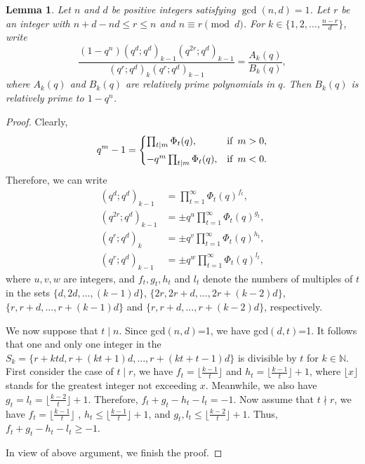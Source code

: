 \documentclass[12pt]{article}
\newtheorem{lem}[thm]{Lemma}
\def\N{{\mathbb N}}
\numberwithin{equation}{section}
\begin{document}
\begin{lem}\label{lem:G-div-n}
    Let $n$ and $d$ be positive integers satisfying $\gcd(n,d)=1$. Let $r$ be an integer with $n+d-nd\leqslant r \leqslant n$ and 
    $n\equiv r \pmod{d} $. For $k\in \{1,2,\dots,\frac{n-r}{d}\}$, write 
    \[\frac{(1-q^n)(q^d;q^d)_{k-1}(q^{2r};q^d)_{k-1}}{(q^r;q^d)_{k}(q^r;q^d)_{k-1}}=\frac{A_k(q)}{B_k(q)},\]
    where $A_k(q)$ and $B_k(q)$ are relatively prime polynomials in $q$. Then $B_k(q)$ is relatively prime to $1-q^n$.
\end{lem}
\begin{proof}
    Clearly,
    \begin{align*}
        q^m-1=
        \begin{cases}
            \prod_{t\mid m}^{}\Phi_t(q),     & \text{if}\hspace{0.5em} m>0,\\[4pt]
            -q^m\prod_{t\mid m}^{}\Phi_t(q), & \text{if}\hspace{0.5em} m<0.
        \end{cases}
    \end{align*}
    Therefore, we can write
    \begin{align*}
        (q^d;q^d)_{k-1}&=\prod_{t=1}^{\infty}\Phi_t(q)^{f_t},\\
        (q^{2r};q^d)_{k-1}&=\pm q^u\prod_{t=1}^{\infty}\Phi_t(q)^{g_t},\\
        (q^{r};q^d)_{k}&=\pm q^v\prod_{t=1}^{\infty}\Phi_t(q)^{h_t},\\
        (q^{r};q^d)_{k-1}&=\pm q^w\prod_{t=1}^{\infty}\Phi_t(q)^{l_t},
    \end{align*}
where $u,v,w$ are integers, and $f_t, g_t,h_t$ and $l_t$ denote the numbers of multiples of $t$
in the sets $\{d,2d, \dots ,(k-1)d \}$, $\{2r, 2r+d,\dots ,2r+(k-2)d\}$, $\{r,r+d,\dots, r+(k-1)d\}$ 
and $\{r,r+d,\dots, r+(k-2)d\}$, respectively.
\par We now suppose that $t\mid n$. Since gcd$(n,d)$=1, we have gcd$(d,t)$=1. It follows that 
one and only one integer in the $S_k=\{r+ktd,r+(kt+1)d,\dots, r+(kt+t-1)d\}$ is divisible by $t$ for $k\in \N$.
First consider the case of $t\mid r$, we have $f_t=\lfloor \frac{k-1}{t}\rfloor$ and $h_t=\lfloor \frac{k-1}{t}\rfloor+1$, where $\lfloor x\rfloor$ stands for 
the greatest integer not exceeding $x$. Meanwhile, we also have $g_t=l_t=\lfloor \frac{k-2}{t}\rfloor+1$. Therefore, 
$f_t+g_t-h_t-l_t= -1$. Now assume that $t\nmid r$, we have $f_t=\lfloor \frac{k-1}{t}\rfloor$ , $h_t\leqslant
\lfloor \frac{k-1}{t}\rfloor+1$, and 
$g_t,l_t\leqslant \lfloor \frac{k-2}{t}\rfloor+1$. Thus, $f_t+g_t-h_t-l_t\geqslant -1$.\par
In view of above argument, we finish the proof.
\end{proof}
\end{document}
